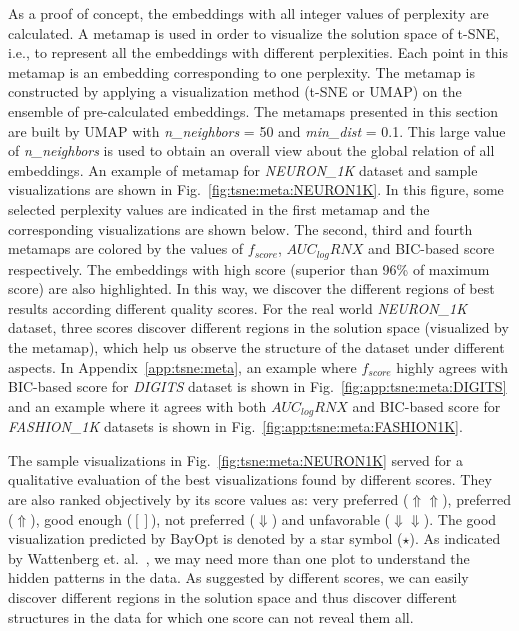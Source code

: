 As a proof of concept, the embeddings with all integer values of perplexity are calculated.
A metamap is used in order to visualize the solution space of t-SNE, i.e., to represent all the embeddings with different perplexities.
Each point in this metamap is an embedding corresponding to one perplexity.
The metamap is constructed by applying a visualization method (t-SNE or UMAP) on the ensemble of pre-calculated embeddings.
The metamaps presented in this section are built by UMAP with \emph{n\_neighbors} = 50 and \emph{min\_dist} = 0.1.
This large value of \emph{n\_neighbors} is used to obtain an overall view about the global relation of all embeddings.
An example of metamap for \emph{NEURON\_1K} dataset and sample visualizations are shown in Fig.~\ref{fig:tsne:meta:NEURON1K}.
In this figure, some selected perplexity values are indicated in the first metamap and the corresponding visualizations are shown below.
The second, third and fourth metamaps are colored by the values of $f_{score}$, $AUC_{log}RNX$ and BIC-based score respectively.
The embeddings with high score (superior than 96\% of maximum score) are also highlighted.
In this way, we discover the different regions of best results according different quality scores.
For the real world \emph{NEURON\_1K} dataset, three scores discover different regions in the solution space (visualized by the metamap), which help us observe the structure of the dataset under different aspects.
In Appendix~\ref{app:tsne:meta}, an example where $f_{score}$ highly agrees with BIC-based score for \emph{DIGITS} dataset is shown in Fig.~\ref{fig:app:tsne:meta:DIGITS}
and an example where it agrees with both $AUC_{log}RNX$ and BIC-based score for \emph{FASHION\_1K} datasets is shown in Fig.~\ref{fig:app:tsne:meta:FASHION1K}.

The sample visualizations in Fig.~\ref{fig:tsne:meta:NEURON1K} served for a qualitative evaluation of the best visualizations found by different scores.
They are also ranked objectively by its score values as: very preferred ($\Uparrow\Uparrow$), preferred ($\Uparrow$), good enough ($[]$), not preferred ($\Downarrow$) and unfavorable ($\Downarrow\Downarrow$).
The good visualization predicted by BayOpt is denoted by a star symbol ($\star$).
As indicated by Wattenberg et. al.~\cite{wattenberg2016use}, we may need more than one plot to understand the hidden patterns in the data.
As suggested by different scores, we can easily discover different regions in the solution space and thus discover different structures in the data for which one score can not reveal them all.


